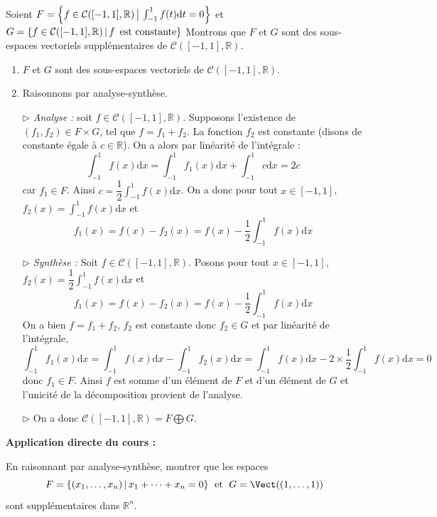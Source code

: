 \documentclass[french,11pt,twoside]{VcCours}
\newenvironment{ApplicationDirecte}{\textbf{Application directe du cours :}

}{}
\newcommand{\dx}{\text{d}x}
\newcommand{\dt}{\text{d}t}
\newcommand{\Int}[2]{\int_{#1}^{#2}}
\begin{document}
\begin{Exemple} Soient $F = \left\lbrace f \in \mathcal{C}([-1,1], \mathbb{R}) \, \big{\vert} \, \int_{ - 1}^{1} f(t) \dt = 0\right\rbrace$ et $G = \left\lbrace  f \in \mathcal{C}([-1,1], \mathbb{R})\, \vert \, f \, \hbox{ est constante} \right\rbrace$
Montrons que $F$ et $G$ sont des sous-espaces vectoriels supplémentaires de $\mathcal{C}([-1,1], \mathbb{R})$.
\begin{enumerate}
\item $F$ et $G$ sont des sous-espaces vectoriels de $\mathcal{C}([-1,1], \mathbb{R})$.
\item Raisonnons par analyse-synthèse.

$\rhd$ \emph{Analyse :} soit $f \in \mathcal{C}([-1,1], \mathbb{R})$. Supposons l'existence de $(f_1,f_2) \in F \times G$, tel que $f=f_1+f_2$. La fonction $f_2$ est constante (disons de constante égale à $c \in \mathbb{R}$). On a alors par linéarité de l'intégrale :
$$ \int_{-1}^{1} f(x) \dx = \int_{-1}^{1} f_1(x) \dx + \int_{-1}^{1} c \dx = 2c $$
car $f_1 \in F$. Ainsi $c = \dfrac{1}{2} \Int{-1}{1} f(x) \dx$. On a donc pour tout $x \in [-1,1]$, $f_2(x) = \Int{-1}{1} f(x) \dx$ et 
$$ f_1(x) = f(x)-f_2(x) = f(x) - \dfrac{1}{2} \Int{-1}{1} f(x) \dx$$

\medskip

$\rhd$ \emph{Synthèse :} Soit $f \in \mathcal{C}([-1,1], \mathbb{R})$. Posons pour tout $x \in [-1,1]$, $f_2(x) = \dfrac{1}{2}\Int{-1}{1} f(x) \dx$ et 
$$ f_1(x) = f(x)-f_2(x) = f(x) - \dfrac{1}{2} \Int{-1}{1} f(x) \dx$$
On a bien $f=f_1+f_2$, $f_2$ est constante donc $f_2 \in G$ et par linéarité de l'intégrale,
$$ \int_{-1}^{1} f_1(x) \dx = \int_{-1}^{1} f(x) \dx - \Int{-1}{1} f_2(x) \dx = \int_{-1}^{1} f(x) \dx - 2 \times \dfrac{1}{2} \int_{-1}^{1} f(x) \dx = 0$$
donc $f_1 \in F$. Ainsi $f$ est somme d'un élément de $F$ et d'un élément de $G$ et l'unicité de la décomposition provient de l'analyse.

\medskip

$\rhd$ On a donc $\mathcal{C}([-1,1], \mathbb{R}) = F \bigoplus G$.
\end{enumerate}

\end{Exemple}
%

\begin{ApplicationDirecte}\label{Exo}  En raisonnant par analyse-synthèse, montrer que les espaces 
$$ F = \lbrace (x_1, \ldots, x_n) \, \vert \, x_1 + \cdots + x_n = 0 \rbrace \; \hbox{ et } \; G= \Vect((1, \ldots, 1)) $$
sont supplémentaires dans $\mathbb{R}^n$.
\end{ApplicationDirecte}
\end{document}
